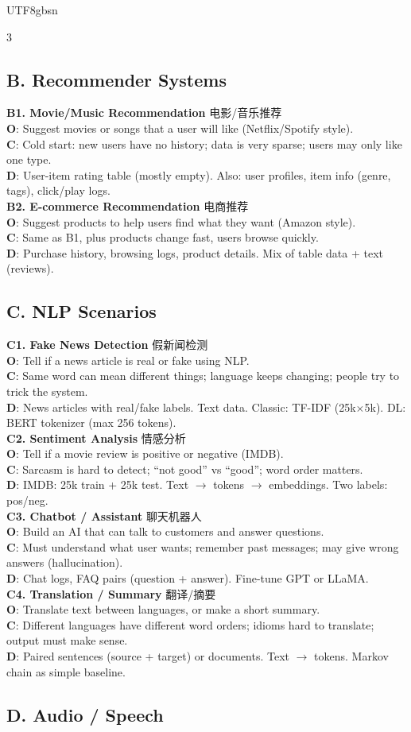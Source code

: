 \documentclass[9pt,landscape,a4paper]{article}
\newcommand{\zhint}[1]{{\scriptsize\color{gray!70!black}#1}}
\newcommand{\scenario}[5]{%
\textbf{#1} \zhint{#2}\\
\textbf{O}: #3\\
\textbf{C}: #4\\
\textbf{D}: #5\\[-3pt]
}
\begin{document}
\begin{CJK}{UTF8}{gbsn}
\begin{multicols}{3}
\subsection{B. Recommender Systems}

\scenario{B1. Movie/Music Recommendation}{电影/音乐推荐}
{Suggest movies or songs that a user will like (Netflix/Spotify style).}
{Cold start: new users have no history; data is very sparse; users may only like one type.}
{User-item rating table (mostly empty). Also: user profiles, item info (genre, tags), click/play logs.}

\scenario{B2. E-commerce Recommendation}{电商推荐}
{Suggest products to help users find what they want (Amazon style).}
{Same as B1, plus products change fast, users browse quickly.}
{Purchase history, browsing logs, product details. Mix of table data + text (reviews).}

\subsection{C. NLP Scenarios}

\scenario{C1. Fake News Detection}{假新闻检测}
{Tell if a news article is real or fake using NLP.}
{Same word can mean different things; language keeps changing; people try to trick the system.}
{News articles with real/fake labels. Text data. Classic: TF-IDF (25k$\times$5k). DL: BERT tokenizer (max 256 tokens).}

\scenario{C2. Sentiment Analysis}{情感分析}
{Tell if a movie review is positive or negative (IMDB).}
{Sarcasm is hard to detect; ``not good'' vs ``good''; word order matters.}
{IMDB: 25k train + 25k test. Text $\to$ tokens $\to$ embeddings. Two labels: pos/neg.}

\scenario{C3. Chatbot / Assistant}{聊天机器人}
{Build an AI that can talk to customers and answer questions.}
{Must understand what user wants; remember past messages; may give wrong answers (hallucination).}
{Chat logs, FAQ pairs (question + answer). Fine-tune GPT or LLaMA.}

\scenario{C4. Translation / Summary}{翻译/摘要}
{Translate text between languages, or make a short summary.}
{Different languages have different word orders; idioms hard to translate; output must make sense.}
{Paired sentences (source + target) or documents. Text $\to$ tokens. Markov chain as simple baseline.}

\subsection{D. Audio / Speech}


\end{multicols}
\end{CJK}
\end{document}
